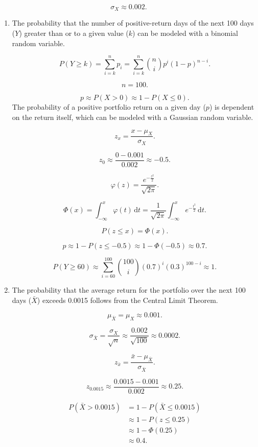 \documentclass[12pt]{article}
\begin{document}
\[\sigma_X\approx 0.002.\]
\begin{enumerate}
\item The probability that the number of positive-return days of the next 100 days ($Y$) greater than or to a given value ($k$) can be modeled with a binomial random variable.

\[P(Y\geq k)=\sum^{n}_{i=k}{p_i}=\sum^{n}_{i=k}{{\binom{n}{i}}p^i(1-p)^{n-i}}.\]

\[n=100.\]

\[p\approx P(X>0)\approx 1-P(X\leq 0).\]
The probability of a positive portfolio return on a given day ($p$) is dependent on the return itself, which can be modeled with a Gaussian random variable.

\[z_x=\frac{x-\mu_X}{\sigma_X}.\]

\[z_0\approx\frac{0-0.001}{0.002}\approx -0.5.\]

\[\varphi(z)=\frac{e^{-\frac{z^2}{2}}}{\sqrt{2\pi}}.\]

\[\Phi(x)=\int^x_{-\infty}{\varphi(t)\,\mathrm{d}t}=\frac{1}{\sqrt{2\pi}}\int^x_{-\infty}{e^{-\frac{t^2}{2}}\,\mathrm{d}t}.\]

\[P(z\leq x)=\Phi(x).\]

\[p\approx 1-P(z\leq -0.5)\approx 1-\Phi(-0.5)\approx 0.7.\]

\[P(Y\geq 60)\approx\sum^{100}_{i=60}{{\binom{100}{i}}(0.7)^i(0.3)^{100-i}}\approx1.\]
\item The probability that the average return for the portfolio over the next 100 days ($\bar{X}$) exceeds 0.0015 follows from the Central Limit Theorem.

\[\mu_{\bar{X}}=\mu_X\approx 0.001.\]

\[\sigma_{\bar{X}}=\frac{\sigma_X}{\sqrt{n}}\approx\frac{0.002}{\sqrt{100}}\approx 0.0002.\]

\[z_{\bar{x}}=\frac{\bar{x}-\mu_{\bar{X}}}{\sigma_{\bar{X}}}.\]

\[z_{0.0015}\approx\frac{0.0015-0.001}{0.002}\approx 0.25.\]

\begin{align}
P(\bar{X}>0.0015)
&=1-P(\bar{X}\leq 0.0015)\\
&\approx 1-P(z\leq 0.25)\\
&\approx 1-\Phi(0.25)\\
&\approx 0.4.
\end{align}

\end{enumerate}
\end{document}
